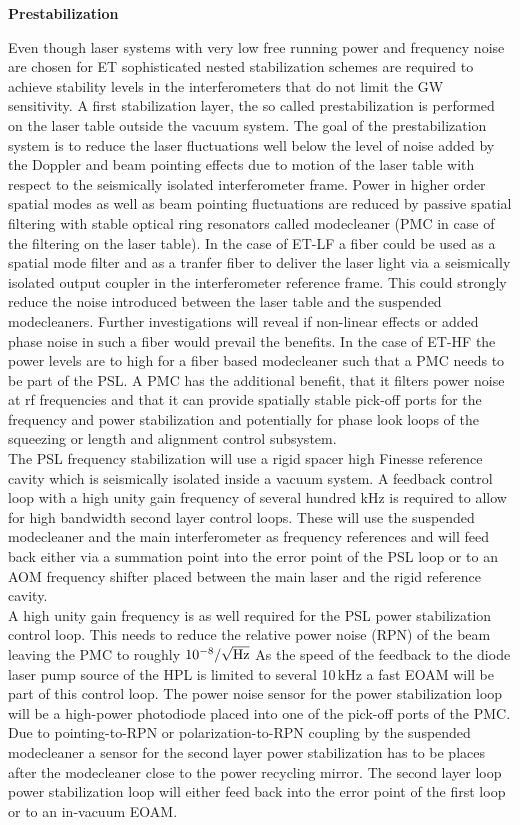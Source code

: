 {\bf Prestabilization}

Even though laser systems with very low free running power and frequency noise are chosen for ET sophisticated nested stabilization schemes are required to achieve stability levels in the interferometers that do not limit the GW sensitivity. A first stabilization layer, the so called prestabilization is performed on the laser table outside the vacuum system. The goal of the prestabilization system is to reduce the laser fluctuations well below the level of noise added by the Doppler and beam pointing effects due to motion of the laser table with respect to the seismically isolated interferometer frame.  
Power in higher order spatial modes as well as beam pointing fluctuations are reduced by passive spatial filtering with stable optical ring resonators called modecleaner (PMC in case of the filtering on the laser table). 
In the case of ET-LF a fiber could be used as a spatial mode filter and as a tranfer fiber to deliver the laser light via a seismically isolated output coupler in the interferometer reference frame. This could strongly reduce the noise introduced between the laser table and the suspended modecleaners. Further investigations will reveal if non-linear effects or added phase noise in such a fiber would prevail the benefits.
In the case of ET-HF the power levels are to high for a fiber based modecleaner such that a PMC needs to be part of the PSL. A PMC has the additional benefit, that it filters power noise at rf frequencies and that it can provide spatially stable pick-off ports for the frequency and power stabilization and potentially for phase look loops of the squeezing or length and alignment control subsystem.
\\
The PSL frequency stabilization will use a rigid spacer high Finesse reference cavity which is seismically isolated inside a vacuum system. A feedback control loop with a high unity gain frequency of several hundred kHz is required to allow for high bandwidth second layer control loops. These will use the suspended modecleaner and the main interferometer as frequency references and will feed back either via a summation point into the error point of the PSL loop or to an AOM frequency shifter placed between the main laser and the rigid reference cavity.
\\
A high unity gain frequency is as well required for the PSL power stabilization control loop. This needs to reduce the relative power noise (RPN) of the beam leaving the PMC to roughly $10^{-8} / \sqrt{\rm{Hz}}$  As the speed of the feedback to the diode laser pump source of the HPL is limited to several 10\,kHz a fast EOAM will be part of this control loop. The power noise sensor for the power stabilization loop will be a high-power photodiode placed into one of the pick-off ports of the PMC. Due to pointing-to-RPN or polarization-to-RPN coupling by the suspended modecleaner a sensor for the second layer power stabilization has to be places after the modecleaner close to the power recycling mirror. The second layer loop power stabilization loop will either feed back into the error point of the first loop or to an in-vacuum EOAM.

